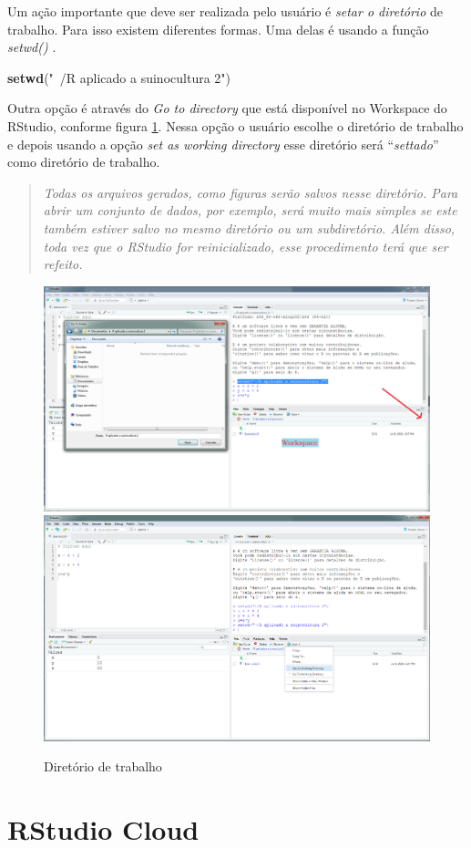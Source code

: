 \documentclass[
]{book}
\newenvironment{Shaded}{\begin{snugshade}}{\end{snugshade}}
\newcommand{\KeywordTok}[1]{\textcolor[rgb]{0.13,0.29,0.53}{\textbf{#1}}}
\newcommand{\NormalTok}[1]{#1}
\newcommand{\StringTok}[1]{\textcolor[rgb]{0.31,0.60,0.02}{#1}}
\begin{document}
Um ação importante que deve ser realizada pelo usuário é \emph{setar o diretório} de trabalho. Para isso existem diferentes formas. Uma delas é usando a função \emph{setwd()} .

\begin{Shaded}
\begin{Highlighting}[]
\KeywordTok{setwd}\NormalTok{(}\StringTok{"~/R aplicado a suinocultura 2"}\NormalTok{)}
\end{Highlighting}
\end{Shaded}

Outra opção é através do \emph{Go to directory} que está disponível no Workspace do RStudio, conforme figura \ref{fig:rstudio2}. Nessa opção o usuário escolhe o diretório de trabalho e depois usando a opção \emph{set as working directory} esse diretório será ``\emph{settado}'' como diretório de trabalho.

\begin{quote}
\emph{Todas os arquivos gerados, como figuras serão salvos nesse diretório. Para abrir um conjunto de dados, por exemplo, será muito mais simples se este também estiver salvo no mesmo diretório ou um subdiretório. Além disso, toda vez que o RStudio for reinicializado, esse procedimento terá que ser refeito.}
\end{quote}

\begin{figure}
\includegraphics[width=0.46\linewidth]{Figuras/RStudio2} \includegraphics[width=0.46\linewidth]{Figuras/RStudio3} \caption{Diretório de trabalho}\label{fig:rstudio2}
\end{figure}

\hypertarget{rstudio-cloud}{%
\section{RStudio Cloud}\label{rstudio-cloud}}
\end{document}
